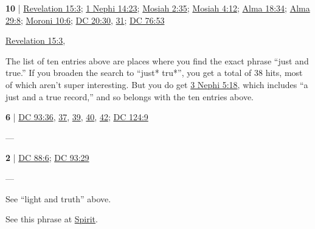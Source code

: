 \begin{compactdesc}
		\item[just and true] \textbf{10} | \hyperref[REVELATIONNT-15-3]{Revelation 15:3}; \hyperref[1NEPHI-14-23]{1 Nephi 14:23}; \hyperref[MOSIAH-2-35]{Mosiah 2:35}; \hyperref[MOSIAH-4-12]{Mosiah 4:12}; \hyperref[ALMA-18-34]{Alma 18:34}; \hyperref[ALMA-29-8]{Alma 29:8}; \hyperref[MORONI-10-6]{Moroni 10:6}; \hyperref[DC20-30]{DC 20:30}, \hyperref[DC20-31]{31}; \hyperref[DC76-53]{DC 76:53}
			\begin{compactdesc}
				\item[Bible anchor verses] \hyperref[REVELATIONNT-15-3]{Revelation 15:3}, 
				\item[Commentary] The list of ten entries above are places where you find the exact phrase ``just and true.'' If you broaden the search to ``just* tru*'', you get a total of 38 hits, most of which aren't super interesting. But you do get \hyperref[3NEPHI-5-18]{3 Nephi 5:18}, which includes ``a just and a true record,'' and so belongs with the ten entries above.
			\end{compactdesc}
			
		\item[light and truth] \textbf{6} | \hyperref[DC93-36]{DC 93:36}, \hyperref[DC93-37]{37}, \hyperref[DC93-39]{39}, \hyperref[DC93-40]{40}, \hyperref[DC93-42]{42}; \hyperref[DC124-9]{DC 124:9}
			\begin{compactdesc}
				\item[Bible anchor verses] ---
				\item[Commentary] 
			\end{compactdesc}
			
		\item[light of truth] \textbf{2} | \hyperref[DC88-6]{DC 88:6}; \hyperref[DC93-29]{DC 93:29}
			\begin{compactdesc}
				\item[Bible anchor verses] ---
				\item[Commentary] See ``light and truth'' above.
			\end{compactdesc}
	
		\item[spirit of truth] See this phrase at \hyperref[SPIRIT-PHRASES]{Spirit}.
			
	\end{compactdesc}
	
